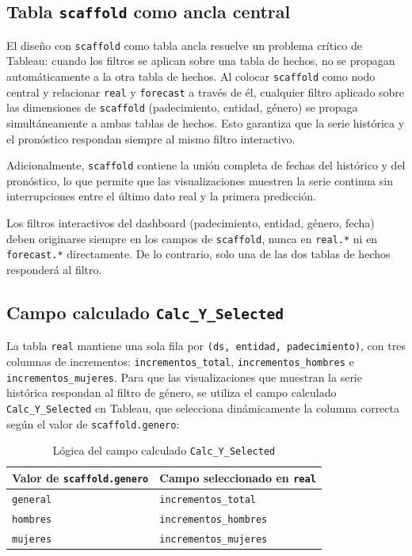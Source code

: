 \documentclass[12pt, letterpaper]{article}
\begin{document}
\subsection{Tabla \texttt{scaffold} como ancla central}

El diseño con \texttt{scaffold} como tabla ancla resuelve un problema crítico de Tableau: cuando los filtros se aplican sobre una tabla de hechos, no se propagan automáticamente a la otra tabla de hechos. Al colocar \texttt{scaffold} como nodo central y relacionar \texttt{real} y \texttt{forecast} a través de él, cualquier filtro aplicado sobre las dimensiones de \texttt{scaffold} (padecimiento, entidad, género) se propaga simultáneamente a ambas tablas de hechos. Esto garantiza que la serie histórica y el pronóstico respondan siempre al mismo filtro interactivo.

Adicionalmente, \texttt{scaffold} contiene la unión completa de fechas del histórico y del pronóstico, lo que permite que las visualizaciones muestren la serie continua sin interrupciones entre el último dato real y la primera predicción.

\begin{warningbox}
Los filtros interactivos del dashboard (padecimiento, entidad, género, fecha) deben originarse siempre en los campos de \texttt{scaffold}, nunca en \texttt{real.*} ni en \texttt{forecast.*} directamente. De lo contrario, solo una de las dos tablas de hechos responderá al filtro.
\end{warningbox}

\subsection{Campo calculado \texttt{Calc\_Y\_Selected}}

La tabla \texttt{real} mantiene una sola fila por \texttt{(ds, entidad, padecimiento)}, con tres columnas de incrementos: \texttt{incrementos\_total}, \texttt{incrementos\_hombres} e \texttt{incrementos\_mujeres}. Para que las visualizaciones que muestran la serie histórica respondan al filtro de género, se utiliza el campo calculado \texttt{Calc\_Y\_Selected} en Tableau, que selecciona dinámicamente la columna correcta según el valor de \texttt{scaffold.genero}:

\begin{table}[H]
\centering
\caption{Lógica del campo calculado \texttt{Calc\_Y\_Selected}}
\label{tab:calc}
\small
\begin{tabular}{l l}
\toprule
\textbf{Valor de \texttt{scaffold.genero}} & \textbf{Campo seleccionado en \texttt{real}} \\
\midrule
\texttt{general} & \texttt{incrementos\_total} \\
\texttt{hombres} & \texttt{incrementos\_hombres} \\
\texttt{mujeres} & \texttt{incrementos\_mujeres} \\
\bottomrule
\end{tabular}
\end{table}
\end{document}

